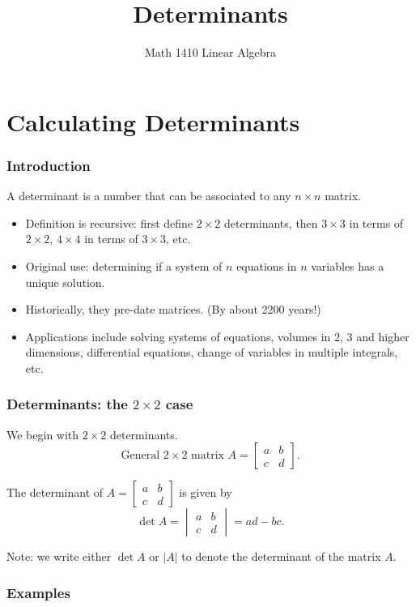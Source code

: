 \documentclass[11pt,t]{beamer}
\date{}
\author{Math 1410 Linear Algebra}
\title{Determinants}
\newcommand{\abs}[1]{\lvert #1\rvert}
\begin{document}
\begin{frame}
\titlepage
\end{frame}

\section{Calculating Determinants}
\begin{frame}
\frametitle{Introduction}
A \alert{determinant} is a number that can be associated to any $n\times n$ matrix.
\begin{itemize}
\item Definition is \alert{recursive}: first define $2\times 2$ determinants, then $3\times 3$ in terms of $2\times 2$, $4\times 4$ in terms of $3\times 3$, etc.
\item Original use: determining if a system of $n$ equations in $n$ variables has a unique solution.
\item Historically, they pre-date matrices. (By about 2200 years!)
\item Applications include solving systems of equations, volumes in 2, 3 and higher dimensions, differential equations, change of variables in multiple integrals, etc.
\end{itemize}

\end{frame}
\begin{frame}
\frametitle{Determinants: the $2\times 2$ case}

We begin with $2\times 2$ determinants. 
\[
\text{General } 2\times 2 \text{ matrix } A = \begin{bmatrix}a&b\\c&d\end{bmatrix}.
\]
\begin{definition}
The \alert{determinant} of $A=\begin{bmatrix}a&b\\c&d\end{bmatrix}$ is given by
\[
\det A = \begin{vmatrix}
a&b\\c&d
\end{vmatrix} = ad-bc.
\]
\end{definition}
Note: we write either $\det A$ or $\abs{A}$ to denote the determinant of the matrix $A$.
\end{frame}
\begin{frame}
\frametitle{Examples}

\end{frame}
\end{document}
